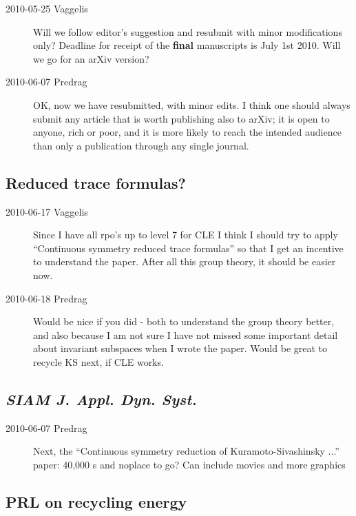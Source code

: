 \begin{description}

\item[2010-05-25 Vaggelis]
Will we follow editor's suggestion and resubmit with minor modifications only?
Deadline for receipt of the {\bf final} manuscripts is July 1st 2010.
Will we go for an arXiv version?

\item[2010-06-07 Predrag]
OK, now we have resubmitted, with minor edits. I think one should always submit
any article that is worth publishing also to arXiv;
it is open to anyone, rich or poor, and it is
more likely to reach the intended audience than only a publication through
any single journal.

\end{description}

\subsection{Reduced trace formulas?}

\begin{description}
 \item[2010-06-17 Vaggelis]
Since I have all rpo's up to level 7 for CLE I think I should try
to apply ``Continuous symmetry reduced trace formulas'' so that I get an incentive
to understand the paper. After all this group theory, it should be easier now.
 \item[2010-06-18 Predrag]
Would be nice if you did - both to understand the group theory better, and
also because I am not sure I have not missed some important detail about
invariant subspaces when I wrote the paper. Would be great to recycle KS 
next, if CLE works. 
\end{description}


\subsection{\emph{SIAM J. Appl. Dyn. Syst.}}

\begin{description}

\item[2010-06-07 Predrag] Next, the
``Continuous symmetry reduction of Kuramoto-Sivashinsky ...'' paper:
40,000 \rpo s and noplace to go?
Can include movies and more graphics

\end{description}

\subsection{PRL on recycling energy}

